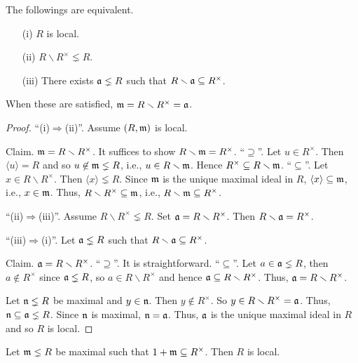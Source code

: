 \begin{proposition}\label{1.22}
    The followings are equivalent.
    \begin{enumerate}
        \item[(i)] $R$ is local.
        \item[(ii)] $R \smallsetminus R^\times \lneq R$.
        \item[(iii)] There exists $\mathfrak{a} \lneq R$ such that $R \smallsetminus \mathfrak{a} \subseteq R^\times$.
    \end{enumerate}
    When these are satisfied, $\mathfrak{m} = R \smallsetminus R^\times = \mathfrak{a}$.
\end{proposition}

\begin{proof}
    ``(i)$\Rightarrow$(ii)''. Assume $(R,\mathfrak{m})$ is local. \par
    Claim. $\mathfrak{m} = R \smallsetminus R^\times$. It suffices to show $R \smallsetminus \mathfrak{m} = R^\times$. ``$\supseteq$''. Let $u \in R^\times$. Then $\langle u \rangle = R$ and so $u \not \in \mathfrak{m} \lneq R$, i.e., $u \in R \smallsetminus \mathfrak{m}$. Hence $R^\times \subseteq R \smallsetminus \mathfrak{m}$. ``$\subseteq$''. Let $x \in R \smallsetminus R^\times$. Then $\langle x \rangle \lneq R$. Since $\mathfrak{m}$ is the unique maximal ideal in $R$, $\langle x \rangle \subseteq \mathfrak{m}$, i.e., $x \in \mathfrak{m}$. Thus, $R \smallsetminus R^\times \subseteq \mathfrak{m}$, i.e., $R \smallsetminus \mathfrak{m} \subseteq R^\times$. \par 
    ``(ii)$\Rightarrow$(iii)''. Assume $R \smallsetminus R^\times \lneq R$. Set $\mathfrak{a} = R \smallsetminus R^\times$. Then $R \smallsetminus \mathfrak{a} = R^\times$. \par 
    ``(iii)$\Rightarrow$(i)''. Let $\mathfrak{a} \lneq R$ such that $R \smallsetminus \mathfrak{a} \subseteq R^\times $. \par
    Claim. $\mathfrak{a} = R \smallsetminus R^\times$. ``$\supseteq$''. It is straightforward. ``$\subseteq$''. Let $a \in \mathfrak{a} \lneq R$, then $a \not \in R^\times$ since $\mathfrak{a} \lneq R$, so $a \in R \smallsetminus R^\times$ and hence $\mathfrak{a} \subseteq R \smallsetminus R^\times$. Thus, $\mathfrak{a} = R \smallsetminus R^\times$. \par
    Let $\mathfrak{n} \lneq R$ be maximal and $y \in \mathfrak{n}$. Then $y \not \in R^\times$. So $y \in R \smallsetminus R^\times = \mathfrak{a}$. Thus, $\mathfrak{n} \subseteq \mathfrak{a} \lneq R$. Since $\mathfrak{n}$ is maximal, $\mathfrak{n} = \mathfrak{a}$. Thus, $\mathfrak{a}$ is the unique maximal ideal in $R$ and so $R$ is local.
\end{proof}

\begin{proposition}\label{1.23}
    Let $\mathfrak{m} \lneq R$ be maximal such that $1 + \mathfrak{m} \subseteq R^\times$. Then $R$ is local.
\end{proposition}

